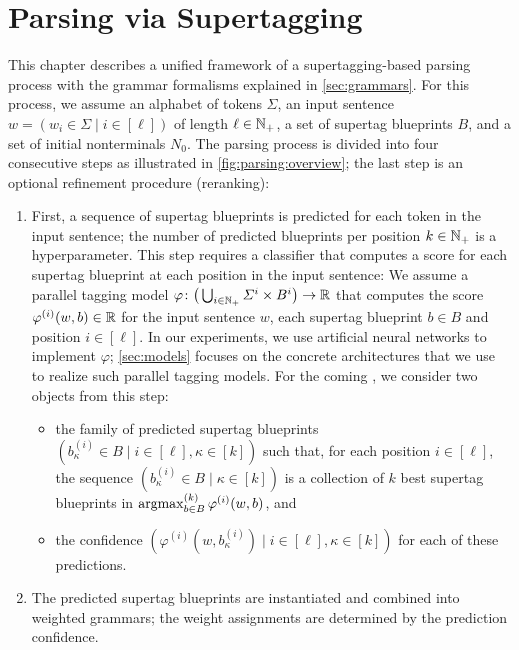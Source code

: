 \documentclass[../document.tex]{subfiles}
\begin{document}
    \chapter{Parsing via Supertagging}\label{chp:parsing}
    This chapter describes a unified framework of a supertagging-based parsing process with the grammar formalisms explained in \cref{sec:grammars}.
    For this process, we assume an alphabet of tokens \(\varSigma\), an input sentence \(w = (w_i \in \varSigma \mid i \in [\ell])\) of length \(\ell \in \mathbb{N}_+\), a set of supertag blueprints \(B\), and a set of initial nonterminals \(N_0\).
    The parsing process is divided into four consecutive steps as illustrated in \cref{fig:parsing:overview}; the last step is an optional refinement procedure (reranking):
    \begin{enumerate}
        \item\label{parsing:item:1}
            First, a sequence of supertag blueprints is predicted for each token in the input sentence; the number of predicted blueprints per position \(k \in \mathbb{N}_+\) is a hyperparameter.
            This step requires a classifier that computes a score for each supertag blueprint at each position in the input sentence:
                We assume a parallel tagging model \(\varphi\colon \big(\bigcup_{i\in \mathbb{N}_+} \varSigma^i \times B^i \big) \to \mathbb{R}\) that computes the score \(\varphi^{(i)}(w, b) \in \mathbb{R}\) for the input sentence \(w\), each supertag blueprint \(b \in B\) and position \(i \in [\ell]\).
            In our experiments, we use artificial neural networks to implement \(\varphi\); \cref{sec:models} focuses on the concrete architectures that we use to realize such parallel tagging models.
            For the coming , we consider two objects from this step:
            \begin{itemize}
                \item the family of predicted supertag blueprints \((b^{(i)}_{\kappa} \in B \mid i \in [\ell], \kappa \in [k])\) such that, for each position \(i\in [\ell]\), the sequence \((b^{(i)}_{\kappa} \in B \mid \kappa \in [k])\) is a collection of \(k\) best supertag blueprints in \(\operatorname{arg max}^{(k)}_{b \in B} \varphi^{(i)}(w, b)\), and
                \item the confidence \((\varphi^{(i)}(w, b^{(i)}_{\kappa}) \mid i \in [\ell], \kappa \in [k])\) for each of these predictions.
            \end{itemize}
        \item\label{parsing:item:2}
            The predicted supertag blueprints are instantiated and combined into weighted grammars; the weight assignments are determined by the prediction confidence.

\end{enumerate}
\end{document}
